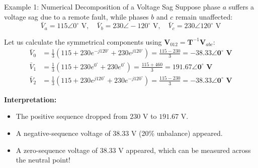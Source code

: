 \begin{frame}[allowframebreaks]{Example 1: Numerical Decomposition of a Voltage Sag}
    Suppose phase $a$ suffers a voltage sag due to a remote fault, while phases $b$ and $c$ remain unaffected:
    \begin{equation}
        \bar{V}_a = 115 \angle 0^\circ \text{ V}, \quad \bar{V}_b = 230 \angle -120^\circ \text{ V}, \quad \bar{V}_c = 230 \angle 120^\circ \text{ V}
    \end{equation}

    Let us calculate the symmetrical components using $\mathbf{V}_{012} = \mathbf{T}^{-1} \mathbf{V}_{abc}$:
    \begin{align}
        \bar{V}_0 &= \frac{1}{3}(115 + 230 e^{-j 120^\circ} + 230 e^{j 120^\circ}) = \frac{115 - 230}{3} = \mathbf{-38.33 \angle 0^\circ \text{ V}} \\
        \bar{V}_1 &= \frac{1}{3}(115 + 230 e^{0^\circ} + 230 e^{0^\circ}) = \frac{115 + 460}{3} = \mathbf{191.67 \angle 0^\circ \text{ V}} \\
        \bar{V}_2 &= \frac{1}{3}(115 + 230 e^{j 120^\circ} + 230 e^{-j 120^\circ}) = \frac{115 - 230}{3} = \mathbf{-38.33 \angle 0^\circ \text{ V}}
    \end{align}

    \textbf{Interpretation:}
    \begin{itemize}
        \item The positive sequence dropped from $230\text{ V}$ to $191.67\text{ V}$.
        \item A negative-sequence voltage of $38.33\text{ V}$ (20\% unbalance) appeared.
        \item A zero-sequence voltage of $38.33\text{ V}$ appeared, which can be measured across the neutral point!
    \end{itemize}
\end{frame}

